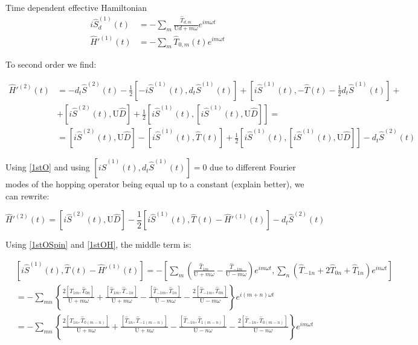 \begin{section}{Time dependent effective Hamiltonian}
\begin{align}
i\hat{S}^{(1)}_d(t) &= -\sum_m \frac{\hat{T}_{d,m}}{\text{U}d+m\omega}e^{im\omega t} \label{1stOSpin}\\
\hat{H}'^{(1)}(t) &= -\sum_m \hat{T}_{0,m}(t)e^{im\omega t} \label{1stOH}
\end{align}

To second order we find:

\begin{align}
\hat{H}'^{(2)}(t) &= - d_t\hat{S}^{(2)}(t) - \frac{1}{2}\left[-i\hat{S}^{(1)}(t), d_t\hat{S}^{(1)}(t) \right] + \left[i\hat{S}^{(1)}(t), -\hat{T}(t)-\frac{1}{2}d_t\hat{S}^{(1)}(t) \right] +\nonumber \\
&+ \left[i\hat{S}^{(2)}(t), \text{U}\hat{D} \right] + \frac{1}{2} \left[i\hat{S}^{(1)}(t), \left[i\hat{S}^{(1)}(t), \text{U}\hat{D} \right] \right] = \nonumber \\
&= \left[i\hat{S}^{(2)}(t), \text{U} \hat{D} \right] - \left[ i\hat{S}^{(1)}(t), \hat{T}(t) \right] + \frac{1}{2}\left[ i\hat{S}^{(1)}(t), \left[ i\hat{S}^{(1)}(t), \text{U}\hat{D} \right] \right] - d_t\hat{S}^{(2)}(t)
\end{align}

Using \ref{1stO} and using $\left[ i\hat{S}^{(1)}(t), d_t\hat{S}^{(1)}(t)\right] = 0$ due to different Fourier modes of the hopping operator being equal up to a constant (explain better), we can rewrite:

\begin{equation}
\hat{H}'^{(2)}(t) = \left[i\hat{S}^{(2)}(t), \text{U} \hat{D} \right] - \frac{1}{2}\left[ i\hat{S}^{(1)}(t), \hat{T}(t) - \hat{H}'^{(1)}(t)\right] - d_t\hat{S}^{(2)}(t)
\end{equation}

Using \ref{1stOSpin} and \ref{1stOH}, the middle term is:

\begin{align*}
&\left[ i\hat{S}^{(1)}(t), \hat{T}(t) - \hat{H}'^{(1)}(t)\right] = -\left[\sum_m \left( \frac{\hat{T}_{1m}}{\text{U}+m\omega} - \frac{\hat{T}_{-1m}}{\text{U}-m\omega} \right)e^{im \omega t}, \sum_n \left( \hat{T}_{-1n} + 2\hat{T}_{0n} + \hat{T}_{1n} \right) e^{in\omega t} \right] \\
&= -\sum_{mn} \left\{ \frac{2\left[\hat{T}_{1m}, \hat{T}_{0n} \right]}{\text{U}+m\omega} + \frac{\left[\hat{T}_{1m}, \hat{T}_{-1n} \right]}{\text{U}+m\omega} - \frac{\left[\hat{T}_{-1m}, \hat{T}_{1n} \right]}{\text{U}-m\omega} - \frac{2\left[\hat{T}_{-1m}, \hat{T}_{0n} \right]}{\text{U}-m\omega} \right\} e^{i(m+n)\omega t} \\
&= -\sum_{mn} \left\{ \frac{2\left[\hat{T}_{1n}, \hat{T}_{0(m-n)} \right]}{\text{U}+n\omega} + \frac{\left[\hat{T}_{1n}, \hat{T}_{-1(m-n)} \right]}{\text{U}+n\omega} - \frac{\left[\hat{T}_{-1n}, \hat{T}_{1(m-n)} \right]}{\text{U}-n\omega} - \frac{2\left[\hat{T}_{-1n}, \hat{T}_{0(m-n)} \right]}{\text{U}-n\omega} \right\} e^{im\omega t}
\end{align*}


\end{section}
